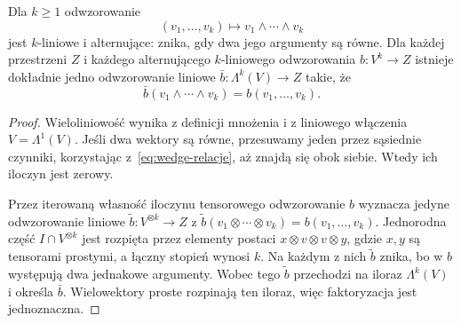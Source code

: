 \begin{twierdzenie}
\label{thm:wedge-multilinear}
Dla $k\geq1$ odwzorowanie
\[
 (v_1,\ldots,v_k)\longmapsto v_1\wedge\cdots\wedge v_k
\]
jest $k$-liniowe i alternujące: znika, gdy dwa jego argumenty
są równe. Dla każdej przestrzeni $Z$ i każdego alternującego
$k$-liniowego odwzorowania $b\colon V^k\to Z$ istnieje dokładnie jedno
odwzorowanie liniowe $\bar b\colon\Lambda^k(V)\to Z$ takie, że
\[
 \bar b(v_1\wedge\cdots\wedge v_k)=b(v_1,\ldots,v_k).
\]
\end{twierdzenie}
\begin{proof}
Wieloliniowość wynika z definicji mnożenia i z liniowego
włączenia $V=\Lambda^1(V)$. Jeśli dwa wektory są równe,
przesuwamy jeden przez sąsiednie czynniki, korzystając
z~\eqref{eq:wedge-relacje}, aż znajdą się obok siebie.
Wtedy ich iloczyn jest zerowy.

Przez iterowaną własność iloczynu tensorowego odwzorowanie $b$
wyznacza jedyne odwzorowanie liniowe
$\widetilde b\colon V^{\otimes k}\to Z$ z
$\widetilde b(v_1\otimes\cdots\otimes v_k)=b(v_1,\ldots,v_k)$.
Jednorodna część $I\cap V^{\otimes k}$ jest rozpięta
przez elementy postaci
$x\otimes v\otimes v\otimes y$, gdzie $x,y$ są tensorami
prostymi, a łączny stopień wynosi $k$. Na każdym z nich
$\widetilde b$ znika, bo w $b$ występują dwa jednakowe
argumenty. Wobec tego $\widetilde b$ przechodzi na iloraz
$\Lambda^k(V)$ i określa $\bar b$.
Wielowektory proste rozpinają ten iloraz, więc faktoryzacja
jest jednoznaczna.
\end{proof}

